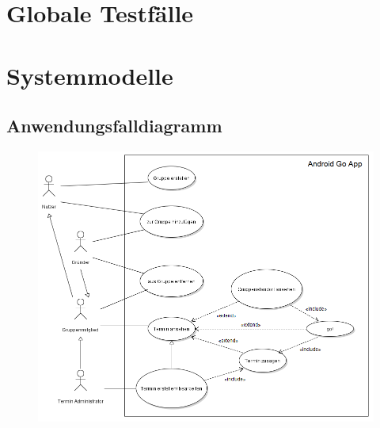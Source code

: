 \documentclass{scrartcl}
\begin{document}
	\newpage


	\section{Globale Testfälle}

	\newpage


	\section{Systemmodelle}
	
	\subsection{Anwendungsfalldiagramm}
	\begin{figure}[h]
	\includegraphics[width=\textwidth]{goApp_useCase}
	\end{figure}

	\newpage
	

	
	
\end{document}
